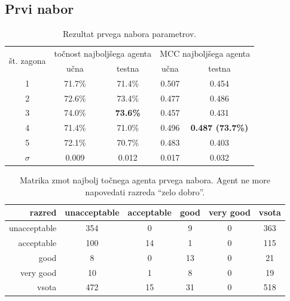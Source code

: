 \subsection{Prvi nabor}\label{subsec:dodatek-car-prvi-nabor}
\begin{table}[H]
    \begin{center}
        \begin{tabular}{|| c | c c || c c ||}
            \hline
            \multirow{2}{*}{št. zagona} & \multicolumn{2}{c||}{točnost najboljšega agenta} & \multicolumn{2}{c||}{MCC najboljšega agenta} \\ \cline{2-5}
            & učna   & testna          & učna  & testna                  \\
            \hline
            1        & 71.7\% & 71.4\%          & 0.507 & 0.454                   \\
            \hline
            2        & 72.6\% & 73.4\%          & 0.477 & 0.486                   \\
            \hline
            3        & 74.0\% & \textbf{73.6\%} & 0.457 & 0.431                   \\
            \hline
            4        & 71.4\% & 71.0\%          & 0.496 & \textbf{0.487 (73.7\%)} \\
            \hline
            5        & 72.1\% & 70.7\%          & 0.483 & 0.403                   \\
            \hline
            $\sigma$ & 0.009  & 0.012           & 0.017 & 0.032                   \\
            \hline
        \end{tabular}
    \end{center}
    \caption{Rezultat prvega nabora parametrov.}
    \label{tab:car_result_1}
\end{table}

\begin{table}[H]
    \centering
    \begin{tabular}{||rccccc||}
        \hline
        razred       & unacceptable & acceptable & good & very good & vsota \\ \hline
        unacceptable & 354          & 0          & 9    & 0         & 363   \\ \hline
        acceptable   & 100          & 14         & 1    & 0         & 115   \\ \hline
        good         & 8            & 0          & 13   & 0         & 21    \\ \hline
        very good    & 10           & 1          & 8    & 0         & 19    \\ \hline
        vsota        & 472          & 15         & 31   & 0         & 518   \\ \hline
    \end{tabular}
    \caption{Matrika zmot najbolj točnega agenta prvega nabora. Agent ne more napovedati razreda \enquote{zelo dobro}.}
    \label{tab:car_acc_1}
\end{table}


